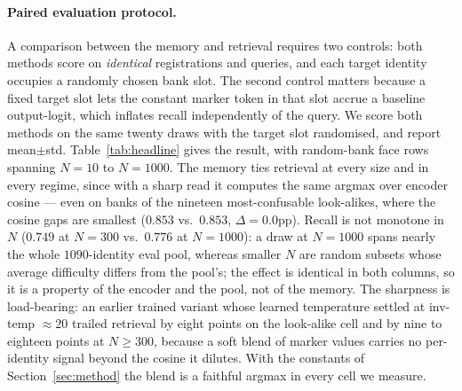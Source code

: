 \paragraph{Paired evaluation protocol.} A comparison between the memory and retrieval requires two controls: both methods score on \emph{identical} registrations and queries, and each target identity occupies a randomly chosen bank slot. The second control matters because a fixed target slot lets the constant marker token in that slot accrue a baseline output-logit, which inflates recall independently of the query. We score both methods on the same twenty draws with the target slot randomised, and report mean$\pm$std. Table~\ref{tab:headline} gives the result, with random-bank face rows spanning $N{=}10$ to $N{=}1000$. The memory ties retrieval at every size and in every regime, since with a sharp read it computes the same argmax over encoder cosine --- even on banks of the nineteen most-confusable look-alikes, where the cosine gaps are smallest ($0.853$ vs.\ $0.853$, $\Delta{=}0.0$pp). Recall is not monotone in $N$ ($0.749$ at $N{=}300$ vs.\ $0.776$ at $N{=}1000$): a draw at $N{=}1000$ spans nearly the whole $1090$-identity eval pool, whereas smaller $N$ are random subsets whose average difficulty differs from the pool's; the effect is identical in both columns, so it is a property of the encoder and the pool, not of the memory. The sharpness is load-bearing: an earlier trained variant whose learned temperature settled at inv-temp $\approx 20$ trailed retrieval by eight points on the look-alike cell and by nine to eighteen points at $N\ge300$, because a soft blend of marker values carries no per-identity signal beyond the cosine it dilutes. With the constants of Section~\ref{sec:method} the blend is a faithful argmax in every cell we measure.

